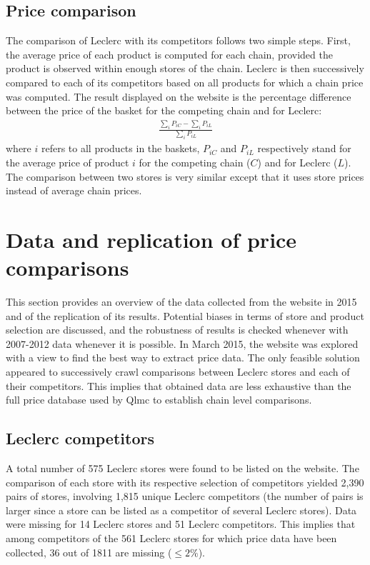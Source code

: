 \documentclass[english]{article}
\begin{document}
\subsection{Price comparison}

The comparison of Leclerc with its competitors follows two simple steps. First, the average price of each product is computed for each chain, provided the product is observed within enough stores of the chain. Leclerc is then successively compared to each of its competitors based on all products for which a chain price was computed. The result displayed on the website is the percentage difference between the price of the basket for the competing chain and for Leclerc:
\begin{align*}
\frac{\sum\limits_{i} P_{iC} - \sum\limits_{i} P_{iL}}{\sum\limits_{i} P_{iL}}
\end{align*}
where $i$ refers to all products in the baskets, $P_{iC}$ and $P_{iL}$ respectively stand for the average price of product $i$ for the competing chain ($C$) and for Leclerc ($L$). The comparison between two stores is very similar except that it uses store prices instead of average chain prices.

\section{Data and replication of price comparisons}

This section provides an overview of the data collected from the website in 2015 and of the replication of its results. Potential biases in terms of store and product selection are discussed, and the robustness of results is checked whenever with 2007-2012 data whenever it is possible. In March 2015, the website was explored with a view to find the best way to extract price data. The only feasible solution appeared to successively crawl comparisons between Leclerc stores and each of their competitors. This implies that obtained data are less exhaustive than the full price database used by Qlmc to establish chain level comparisons.

\subsection{Leclerc competitors}

A total number of 575 Leclerc stores were found to be listed on the website. The comparison of each store with its respective selection of competitors yielded 2,390 pairs of stores, involving 1,815 unique Leclerc competitors (the number of pairs is larger since a store can be listed as a competitor of several Leclerc stores). Data were missing for 14 Leclerc stores and 51 Leclerc competitors. This implies that among competitors of the 561 Leclerc stores for which price data have been collected, 36 out of 1811 are missing ($\le 2 \%$).
\end{document}
